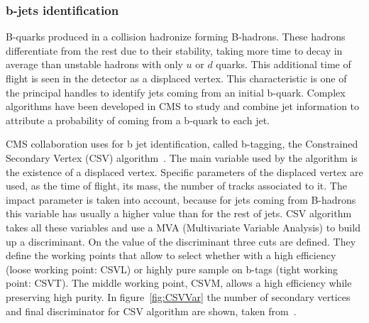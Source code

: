 \subsubsection{b-jets identification}
\label{sec:bid}

B-quarks produced in a collision hadronize forming B-hadrons. These hadrons differentiate from the rest due to their stability, taking more time to decay in average than unstable hadrons with only $u$ or $d$ quarks. This additional time of flight is seen in the detector as a displaced vertex. This characteristic is one of the principal handles to identify jets coming from an initial b-quark. Complex algorithms have been developed in CMS to study and combine jet information to attribute a probability of coming from a b-quark to each jet.  

%
CMS collaboration uses for b jet identification, called b-tagging, the Constrained Secondary Vertex (CSV) algorithm~\cite{Chatrchyan:2012jua, CMS:2013vea}. The main variable used by the algorithm is the existence of a displaced vertex. Specific parameters of the displaced vertex are used, as the time of flight, its mass, the number of tracks associated to it. The impact parameter is taken into account, because for jets coming from B-hadrons this variable has usually a higher value than for the rest of jets. CSV algorithm takes all these variables and use a MVA (Multivariate Variable Analysis) to build up a discriminant. On the value of the discriminant three cuts are defined. They define the working points that allow to select whether with a high efficiency (loose working point: CSVL) or highly pure sample on b-tags (tight working point: CSVT). The middle working point, CSVM, allows a high efficiency while preserving high purity. In figure~\ref{fig:CSVVar} the number of secondary vertices and final discriminator for CSV algorithm are shown, taken from~\cite{CMS-PAS-BTV-13-001}.

